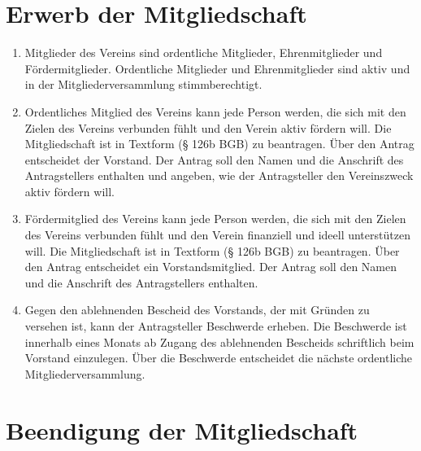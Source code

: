 \chapter{Erwerb der Mitgliedschaft}
\begin{enumerate}
	\item Mitglieder des Vereins sind ordentliche Mitglieder, Ehrenmitglieder und Fördermitglieder. Ordentliche Mitglieder und Ehrenmitglieder sind aktiv und in der Mitgliederversammlung stimmberechtigt.
	\item Ordentliches Mitglied des Vereins kann jede Person werden, die sich mit den Zielen des Vereins verbunden fühlt und den Verein aktiv fördern will. Die Mitgliedschaft ist in Textform (§ 126b BGB) zu beantragen. Über den Antrag entscheidet der Vorstand. Der Antrag soll den Namen und die Anschrift des Antragstellers enthalten und angeben, wie der Antragsteller den Vereinszweck aktiv fördern will.
	\item Fördermitglied des Vereins kann jede Person werden, die sich mit den Zielen des Vereins verbunden fühlt und den Verein finanziell und ideell unterstützen will. Die Mitgliedschaft ist in Textform (§ 126b BGB) zu beantragen. Über den Antrag entscheidet ein Vorstandsmitglied. Der Antrag soll den Namen und die Anschrift des Antragstellers enthalten.
	\item Gegen den ablehnenden Bescheid des Vorstands, der mit Gründen zu versehen ist, kann der Antragsteller Beschwerde erheben. Die Beschwerde ist innerhalb eines Monats ab Zugang des ablehnenden Bescheids schriftlich beim Vorstand einzulegen. Über die Beschwerde entscheidet die nächste ordentliche Mitgliederversammlung.
\end{enumerate}

\chapter{Beendigung der Mitgliedschaft}


